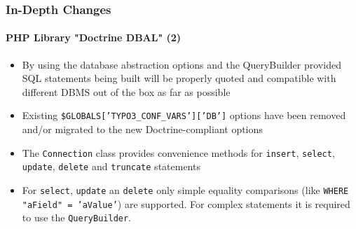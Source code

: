 \begin{frame}[fragile]
	\frametitle{In-Depth Changes}
	\framesubtitle{PHP Library "Doctrine DBAL" (2)}

	\begin{itemize}

		\item By using the database abstraction options and the QueryBuilder
			provided SQL statements being built will be properly quoted and compatible
			with different DBMS out of the box as far as possible

		\item Existing \texttt{\$GLOBALS['TYPO3\_CONF\_VARS']['DB']} options have been
			removed and/or migrated to the new Doctrine-compliant options

		\item The \texttt{Connection} class provides convenience methods for
			\texttt{insert}, \texttt{select}, \texttt{update}, \texttt{delete} and
			\texttt{truncate} statements

		\item For \texttt{select}, \texttt{update} an \texttt{delete} only simple
			equality comparisons (like \texttt{WHERE "aField" = 'aValue'}) are supported.
			For complex statements it is required to use the \texttt{QueryBuilder}.

	\end{itemize}

\end{frame}

